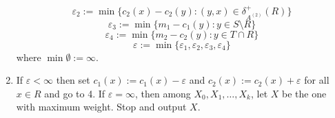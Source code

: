 \documentclass[english,12pt]{article}
\begin{document}
\begin{enumerate}
{            $$ \varepsilon_2 := \min \{c_2(x) - c_2(y) : (y, x) \in \delta_{A^{(2)}}^+(R)\} $$
            $$ \varepsilon_3 := \min \{m_1 - c_1(y) : y \in S \setminus R \} $$
            $$ \varepsilon_4 := \min \{m_2 - c_2(y) : y \in T \cap R \} $$
            $$ \varepsilon := \min \{ \varepsilon_1, \varepsilon_2, \varepsilon_3, \varepsilon_4 \} $$
            where $\min \emptyset := \infty $.
        }
        \item {
            If $\varepsilon < \infty$ then set $c_1(x) := c_1(x) - \varepsilon$ and $c_2(x) := c_2(x) + \varepsilon$ for all $x \in R$ and go to 4.
            If $\varepsilon = \infty$, then among $X_0, X_1, \dots, X_k$, let $X$ be the one with maximum weight. Stop and output $X$.
        }
    \end{enumerate}
\end{document}
